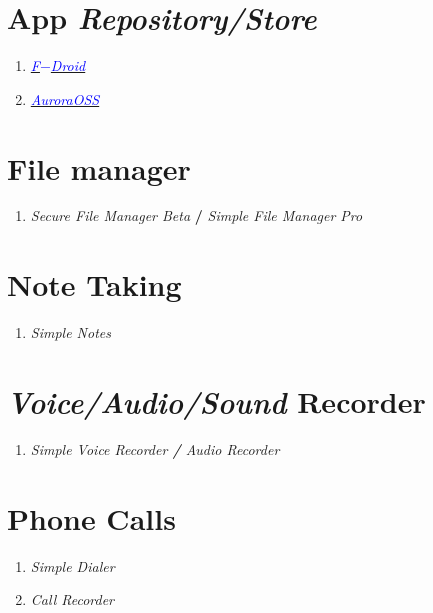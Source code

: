 \documentclass[12pt , a4paper]{article}
\begin{document}
\paragraph{}

\newpage
\section{App \emph{Repository/Store}}
\begin{enumerate}
	\large
	\item \href{https://f-droid.org}{\emph{\textcolor{blue}{F$-$Droid}}} 
	\item \href{https://auroraoss.com}{\emph{\textcolor{blue}{AuroraOSS}}}
\end{enumerate}

\section{File manager}
\begin{enumerate}
	\item[] \emph{Secure File Manager Beta} \textbf{/} \emph{Simple File Manager Pro}
\end{enumerate}

\section{Note Taking}
\begin{enumerate}
	\item[] \emph{Simple Notes} 
\end{enumerate}

\section{\emph{Voice/Audio/Sound} Recorder}
\begin{enumerate}
	\item[] \emph{Simple Voice Recorder \textbf{/} Audio Recorder}
\end{enumerate}

\section{Phone Calls}
\begin{enumerate}
	\item \emph{Simple Dialer}
	\item \emph{Call Recorder}
\end{enumerate}
\end{document}
